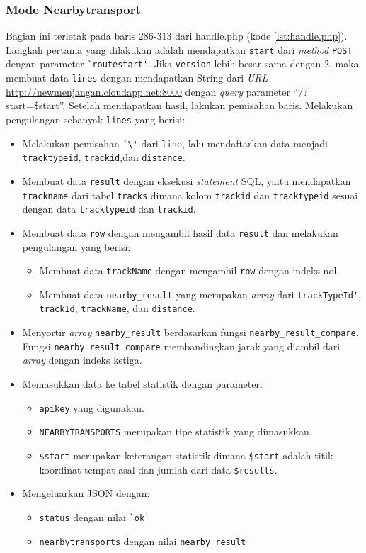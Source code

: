 \subsubsection{Mode Nearbytransport}
Bagian ini terletak pada baris 286-313 dari handle.php (kode \ref{lst:handle.php}). Langkah pertama yang dilakukan adalah mendapatkan \verb!start! dari \textit{method} \verb!POST! dengan parameter \verb!`routestart'!. Jika \verb!version! lebih besar sama dengan 2, maka membuat data \verb!lines! dengan mendapatkan String dari \textit{URL} \url{http://newmenjangan.cloudapp.net:8000} dengan \textit{query} parameter ``/?start=\$start''. Setelah mendapatkan hasil, lakukan pemisahan baris. Melakukan pengulangan sebanyak \verb!lines! yang berisi:
\begin{itemize}
	\item Melakukan pemisahan \verb!`\'! dari \verb!line!, lalu mendaftarkan data menjadi  \verb!tracktypeid!, \verb!trackid!,dan \verb!distance!.
	\item Membuat data \verb!result! dengan eksekusi \textit{statement} SQL, yaitu mendapatkan \verb!trackname! dari tabel \verb!tracks! dimana kolom \verb!trackid! dan \verb!tracktypeid! sesuai dengan data \verb!tracktypeid! dan \verb!trackid!.
	\item Membuat data \verb!row! dengan mengambil hasil data \verb!result! dan melakukan pengulangan yang berisi:
	\begin{itemize}
		\item Membuat data \verb!trackName! dengan mengambil \verb!row! dengan indeks nol.
		\item Membuat data \verb!nearby_result! yang merupakan \textit{array} dari \verb!trackTypeId'!, \verb!trackId!, \verb!trackName!, dan \verb!distance!.
	\end{itemize}
	\item Menyortir \textit{array} \verb!nearby_result! berdasarkan fungsi \verb!nearby_result_compare!. Fungsi \verb!nearby_result_compare! membandingkan jarak yang diambil dari \textit{array} dengan indeks ketiga.
	\item Memasukkan data ke tabel statistik dengan parameter:
	\begin{itemize}
		\item \verb!apikey! yang digunakan.
		\item \verb!NEARBYTRANSPORTS! merupakan tipe statistik yang dimasukkan.
		\item \verb!$start! merupakan keterangan statistik dimana \verb!$start! adalah titik koordinat tempat asal dan jumlah dari data \verb!$results!.
	\end{itemize}
	\item Mengeluarkan JSON dengan:
\begin{itemize}
			\item \verb!status! dengan nilai \verb!`ok'!
			\item \verb!nearbytransports! dengan nilai \verb!nearby_result!
\end{itemize} 
	
\end{itemize}

